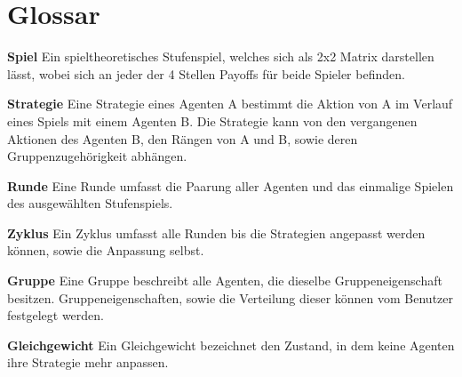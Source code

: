 \section{Glossar}

\textbf{Spiel}
Ein spieltheoretisches Stufenspiel, welches sich als 2x2 Matrix darstellen lässt, wobei sich an jeder der 4 Stellen Payoffs für beide Spieler befinden.

\textbf{Strategie}
Eine Strategie eines Agenten A bestimmt die Aktion von A im Verlauf eines Spiels mit einem Agenten B. Die Strategie kann von den vergangenen Aktionen des Agenten B, den Rängen von A und B, sowie deren Gruppenzugehörigkeit abhängen.

\textbf{Runde}
Eine Runde umfasst die Paarung aller Agenten und das einmalige Spielen des ausgewählten Stufenspiels.

\textbf{Zyklus}
Ein Zyklus umfasst alle Runden bis die Strategien angepasst werden können, sowie die Anpassung selbst.

\textbf{Gruppe}
Eine Gruppe beschreibt alle Agenten, die dieselbe Gruppeneigenschaft besitzen. Gruppeneigenschaften, sowie die Verteilung dieser können vom Benutzer festgelegt werden.

\textbf{Gleichgewicht}
Ein Gleichgewicht bezeichnet den Zustand, in dem keine Agenten ihre Strategie mehr anpassen.

